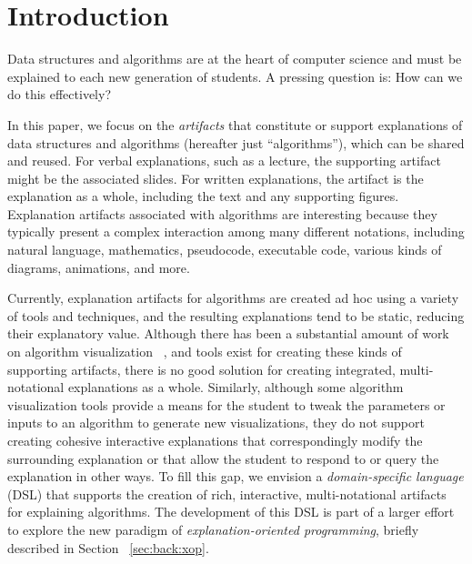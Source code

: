 \documentclass[sigconf]{acmart}
\begin{document}



\maketitle

\section{Introduction}
\label{sec:intro}

Data structures and algorithms are at the heart of computer science and must be
explained to each new generation of students. A pressing question is: How can we
do this effectively?

In this paper, we focus on the \emph{artifacts} that constitute or support
explanations of data structures and algorithms (hereafter just ``algorithms''),
which can be shared and reused.
%
For verbal explanations, such as a lecture, the supporting artifact might be
the associated slides. For written explanations, the artifact is the
explanation as a whole, including the text and any supporting figures.
%
Explanation artifacts associated with algorithms are interesting because they
typically present a complex interaction among many different notations,
including natural language, mathematics, pseudocode, executable code, various
kinds of diagrams, animations, and more.


Currently, explanation artifacts for algorithms are created ad hoc using a
variety of tools and techniques, and the resulting explanations tend to be
static, reducing their explanatory value.
%
Although there has been a substantial amount of work on algorithm visualization~
\cite{Gloor92,Gloor97,HDS02, shaffer2010algorithm, HANSEN2002291, KANN1997223},
and tools exist for creating these kinds of supporting artifacts, there is no
good solution for creating integrated, multi-notational explanations as a whole.
Similarly, although some algorithm visualization tools provide a means for the
student to tweak the parameters or inputs to an algorithm to generate new
visualizations, they do not support creating cohesive interactive explanations
that correspondingly modify the surrounding explanation or that allow the
student to respond to or query the explanation in other ways.
%
To fill this gap, we envision a \emph{domain-specific language} (DSL) that
supports the creation of rich, interactive, multi-notational artifacts for
explaining algorithms.
%
The development of this DSL is part of a larger effort to explore the new
paradigm of \emph{explanation-oriented programming}, briefly described in
Section~ \ref{sec:back:xop}.
\end{document}
